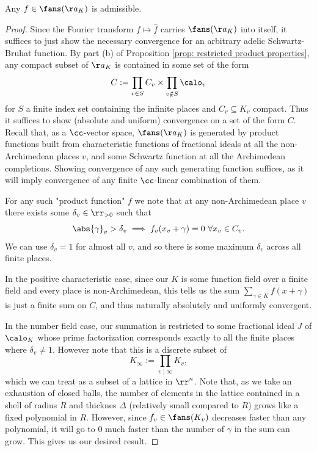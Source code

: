 \documentclass[11pt, x11names, openany]{book}
\begin{document}
\begin{lemma}
\label{lemma: adelic SB-func is admissible}
Any $f \in \fans(\aa_K)$ is admissible.
\end{lemma}
\begin{proof}
Since the Fourier transform $f \mapsto \hat{f}$ carries $\fans(\aa_K)$ into itself, it suffices to just show the necessary convergence for an arbitrary adelic Schwartz-Bruhat function. By part (b)  of Proposition \ref{prop: restricted product properties}, any compact subset of $\aa_K$ is contained in some set of the form
\begin{equation*}
    C := \prod_{v \in S} C_v \times \prod_{v \notin S} \calo_v
\end{equation*}
for $S$ a finite index set containing the infinite places and $C_v \subseteq K_v$ compact. Thus it suffices to show (absolute and uniform) convergence on a set of the form $C$. Recall that, as a $\cc$-vector space, $\fans(\aa_K)$ is generated by product functions built from characteristic functions of fractional ideals at all the non-Archimedean places $v$, and some Schwartz function at all the Archimedean completions. Showing convergence of any such generating function suffices, as it will imply convergence of any finite $\cc$-linear combination of them.

For any such "product function" $f$ we note that at any non-Archimedean place $v$ there exists some $\delta_v \in \rr_{> 0}$ such that
\begin{equation*}
\abs{\gamma}_v > \delta_v \implies f_v(x_v + \gamma) = 0 \  \forall x_v \in C_v.
\end{equation*}
We can use $\delta_v = 1$ for almost all $v$, and so there is some maximum $\delta_v$ across all finite places.

In the positive characteristic case, since our $K$ is some function field over a finite field and every place is non-Archimedean, this tells us the sum $\sum_{\gamma \in K}f(x + \gamma)$ is just a finite sum on  $C$, and thus naturally absolutely and uniformly convergent.

In the number field case, our summation is restricted to some fractional ideal $J$ of $\calo_K$ whose prime factorization corresponds exactly to all the finite places where $\delta_v \neq 1$. However note that this is a discrete subset of 
\begin{equation*}
    K_\infty := \prod_{v \mid \infty} K_v,
\end{equation*}
 which we can treat as a subset of a lattice in $\rr^n$. Note that, as we take an exhaustion of closed balls, the number of elements in the lattice contained in a shell of radius $R$ and thicknes $\Delta$ (relatively small compared to $R$) grows like a fixed polynomial in $R$. However, since $f_v \in \fans(K_v)$ decreases faster than any polynomial, it will go to 0 much faster than the number of $\gamma$ in the sum can grow. This gives us our desired result.
\end{proof}
\end{document}
